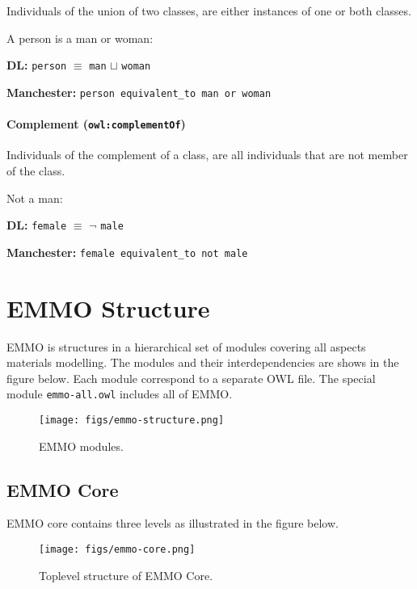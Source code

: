 \documentclass[a4paper,]{report}
\let\oldparagraph\paragraph
\renewcommand{\paragraph}[1]{\oldparagraph{#1}\mbox{}}
\begin{document}
Individuals of the union of two classes, are either instances of one or
both classes.

A person is a man or woman:

\textbf{DL:} \texttt{person} \(\equiv\) \texttt{man} \(\sqcup\)
\texttt{woman}

\textbf{Manchester:} \texttt{person\ equivalent\_to\ man\ or\ woman}

\hypertarget{complement-owlcomplementof}{%
\paragraph{\texorpdfstring{Complement
(\texttt{owl:complementOf})}{Complement (owl:complementOf)}}\label{complement-owlcomplementof}}

Individuals of the complement of a class, are all individuals that are
not member of the class.

Not a man:

\textbf{DL:} \texttt{female} \(\equiv\) \(\lnot\) \texttt{male}

\textbf{Manchester:} \texttt{female\ equivalent\_to\ not\ male}

\hypertarget{emmo-structure}{%
\section{EMMO Structure}\label{emmo-structure}}

EMMO is structures in a hierarchical set of modules covering all aspects
materials modelling. The modules and their interdependencies are shows
in the figure below. Each module correspond to a separate OWL file. The
special module \texttt{emmo-all.owl} includes all of EMMO.

\begin{figure}
\centering
\texttt{[image: figs/emmo-structure.png]}
\caption{EMMO modules.}
\end{figure}

\hypertarget{emmo-core}{%
\subsection{EMMO Core}\label{emmo-core}}

EMMO core contains three levels as illustrated in the figure below.

\begin{figure}
\centering
\texttt{[image: figs/emmo-core.png]}
\caption{Toplevel structure of EMMO Core.}
\end{figure}
\end{document}
